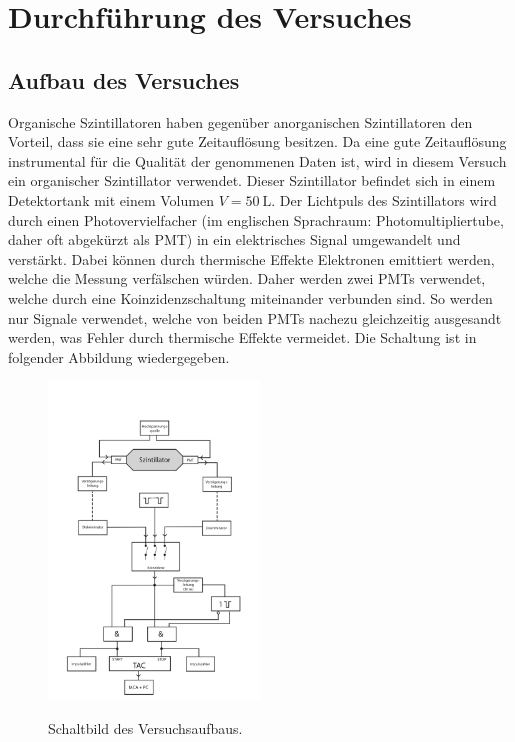 \section{Durchführung des Versuches}
\label{sec:Durchführung}

\subsection{Aufbau des Versuches}
\label{subsec:Aufbau}

Organische Szintillatoren haben gegenüber anorganischen Szintillatoren den Vorteil, dass sie eine sehr
gute Zeitauflösung besitzen. Da eine gute Zeitauflösung instrumental für die Qualität der genommenen
Daten ist, wird in diesem Versuch ein organischer Szintillator verwendet.
Dieser Szintillator befindet sich in einem Detektortank mit einem Volumen $V = \SI{50}{\liter}$.
Der Lichtpuls des Szintillators wird durch einen Photovervielfacher (im englischen Sprachraum: Photomultipliertube,
daher oft abgekürzt als PMT) in ein elektrisches Signal umgewandelt und verstärkt.
Dabei können durch thermische Effekte Elektronen emittiert werden, welche die
Messung verfälschen würden. Daher werden zwei PMTs verwendet, welche durch eine
Koinzidenzschaltung miteinander verbunden sind. So werden nur Signale verwendet, welche
von beiden PMTs nachezu gleichzeitig ausgesandt werden, was Fehler durch thermische
Effekte vermeidet.
Die Schaltung ist in folgender Abbildung wiedergegeben.

\begin{figure}
  \centering
    \includegraphics[width=0.5\textwidth]{pictures/Schaltbild.png}
    \label{fig:Schaltbild}
    \caption{Schaltbild des Versuchsaufbaus.}
\end{figure}

